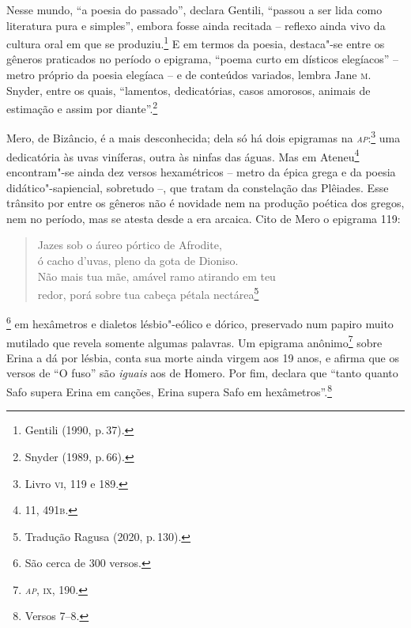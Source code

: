 Nesse mundo, “a poesia do passado”, declara Gentili, “passou a
ser lida como literatura pura e simples”, embora fosse ainda recitada -- reflexo
ainda vivo da cultura oral em que se produziu.\footnote{ Gentili (1990, p.\,37).} E em termos da poesia,
destaca"-se entre os gêneros praticados no período o epigrama, “poema curto em
dísticos elegíacos” -- metro próprio da poesia elegíaca -- e de conteúdos
variados, lembra Jane \textsc{m}.\,Snyder, entre os quais, “lamentos,
dedicatórias, casos amorosos, animais de estimação e assim por diante”.\footnote{ Snyder (1989, p.\,66).}

Mero, de Bizâncio, é a mais desconhecida; dela só há dois epigramas na \textit{\textsc{ap}}:\footnote{Livro \textsc{vi}, 119 e 189.} uma dedicatória às uvas viníferas,
outra às ninfas das águas. Mas em Ateneu\footnote{11, 491\textsc{b}.} encontram"-se ainda dez
versos hexamétricos -- metro da épica grega e da poesia didático"-sapiencial,
sobretudo --, que tratam da constelação das Plêiades. Esse trânsito por entre os
gêneros não é novidade nem na produção poética dos gregos, nem no período, mas
se atesta desde a era arcaica.
Cito de Mero o epigrama 119:

\begin{verse}
\small{Jazes sob o áureo pórtico de Afrodite,\\
ó cacho d'uvas, pleno da gota de Dioniso.\\
Não mais tua mãe, amável ramo atirando em teu\\
redor, porá sobre tua cabeça pétala nectárea}\footnote{Tradução Ragusa (2020, p.\,130).}
\end{verse}

\footnote{São cerca de 300 versos.} em hexâmetros e dialetos
lésbio"-eólico e dórico, preservado num papiro muito mutilado que revela somente
algumas palavras. Um epigrama anônimo\footnote{\textit{\textsc{ap}}, \textsc{ix}, 190.}
sobre Erina a dá por lésbia, conta sua morte ainda virgem aos 19 anos, e
afirma que os versos de “O fuso” são \textit{iguais} aos de Homero. Por fim,
declara que ``tanto quanto Safo supera Erina em canções, Erina supera
Safo em hexâmetros”.\footnote{Versos 7--8.}

